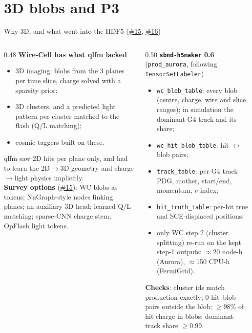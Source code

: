 \documentclass[aspectratio=169,10pt]{beamer}
\newcommand{\code}[1]{\texttt{#1}}
\newcommand{\gh}{https://github.com/HaiwangYu/fm4npp-lartpc}
\newcommand{\iss}[1]{\href{\gh/issues/#1}{\color{blue!60!black}\##1}}
\begin{document}
\section{3D blobs and P3}
\begin{frame}{Why 3D, and what went into the HDF5 (\iss{15}, \iss{16})}
  \footnotesize
  \begin{columns}[T]
    \begin{column}{0.48\textwidth}
      \textbf{Wire-Cell has what qlfm lacked}
      \begin{itemize}\setlength{\itemsep}{2pt}
        \item 3D imaging: blobs from the 3 planes per time slice, charge solved with a sparsity prior;
        \item 3D clusters, and a predicted light pattern per cluster matched to the flash (Q/L matching);
        \item cosmic taggers built on these.
      \end{itemize}
      qlfm saw 2D hits per plane only, and had to learn the 2D$\to$3D geometry and charge$\to$light physics implicitly.\\[4pt]
      \textbf{Survey options} (\iss{15}): WC blobs as tokens; NuGraph-style nodes linking planes; an auxiliary 3D head; learned Q/L matching;
      sparse-CNN charge stem; OpFlash light tokens.
    \end{column}
    \begin{column}{0.50\textwidth}
      \textbf{\code{sbnd-h5maker} 0.6} (\code{prod\_aurora}, following \code{TensorSetLabeler})
      \begin{itemize}\setlength{\itemsep}{2pt}
        \item \code{wc\_blob\_table}: every blob (centre, charge, wire and slice ranges); in simulation the dominant G4 track and its share;
        \item \code{wc\_hit\_blob\_table}: hit $\leftrightarrow$ blob pairs;
        \item \code{track\_table}: per G4 track PDG, mother, start/end, momentum, $\nu$ index;
        \item \code{hit\_truth\_table}: per-hit true and SCE-displaced positions;
        \item only WC step 2 (cluster splitting) re-run on the kept step-1 outputs: $\approx$20 node-h (Aurora), $\approx$150 CPU-h (FermiGrid).
      \end{itemize}
      \textbf{Checks}: cluster ids match production exactly; 0 hit--blob pairs outside the blob; $\ge$98\% of hit charge in blobs;
      dominant-track share $\ge$0.99.
    \end{column}
  \end{columns}
\end{frame}
\end{document}
